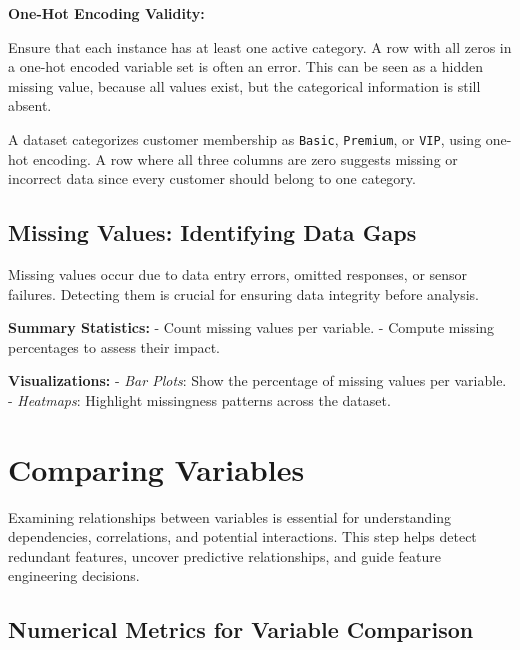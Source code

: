 \documentclass[12pt,openany]{book}
\begin{document}
\textbf{One-Hot Encoding Validity:}

Ensure that each instance has at least one active category. A row with all zeros in a one-hot encoded variable set is often an error. This can be seen as a hidden missing value, because all values exist, but the categorical information is still absent.

\begin{examplebox}
A dataset categorizes customer membership as \texttt{Basic}, \texttt{Premium}, or \texttt{VIP}, using one-hot encoding. A row where all three columns are zero suggests missing or incorrect data since every customer should belong to one category.
\end{examplebox}


\subsection{Missing Values: Identifying Data Gaps}

Missing values occur due to data entry errors, omitted responses, or sensor failures. 
Detecting them is crucial for ensuring data integrity before analysis.
\newline

\textbf{Summary Statistics:}  
\newline
- Count missing values per variable.  
- Compute missing percentages to assess their impact.  
\newline

\textbf{Visualizations:}  
\newline
- \textit{Bar Plots}: Show the percentage of missing values per variable.  
- \textit{Heatmaps}: Highlight missingness patterns across the dataset.  
\newline


\section{Comparing Variables}

Examining relationships between variables is essential for understanding dependencies, correlations, and potential interactions. This step helps detect redundant features, uncover predictive relationships, and guide feature engineering decisions. 

\subsection{Numerical Metrics for Variable Comparison}
\end{document}
